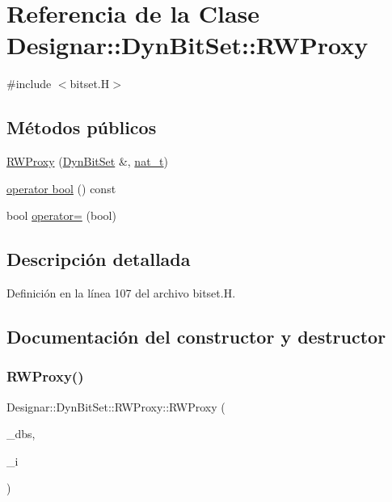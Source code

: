 \hypertarget{class_designar_1_1_dyn_bit_set_1_1_r_w_proxy}{}\section{Referencia de la Clase Designar\+:\+:Dyn\+Bit\+Set\+:\+:R\+W\+Proxy}
\label{class_designar_1_1_dyn_bit_set_1_1_r_w_proxy}


{\ttfamily \#include $<$bitset.\+H$>$}

\subsection*{Métodos públicos}
\begin{DoxyCompactItemize}
\item 
\hyperlink{class_designar_1_1_dyn_bit_set_1_1_r_w_proxy_aef016918f952b339bfb60b29f6b9bcbb}{R\+W\+Proxy} (\hyperlink{class_designar_1_1_dyn_bit_set}{Dyn\+Bit\+Set} \&, \hyperlink{namespace_designar_aa72662848b9f4815e7bf31a7cf3e33d1}{nat\+\_\+t})
\item 
\hyperlink{class_designar_1_1_dyn_bit_set_1_1_r_w_proxy_ae2b7bc44f30f8b75d8fc2306167f9598}{operator bool} () const
\item 
bool \hyperlink{class_designar_1_1_dyn_bit_set_1_1_r_w_proxy_ad9dff242f5550a97af94c1e4ecd163ad}{operator=} (bool)
\end{DoxyCompactItemize}


\subsection{Descripción detallada}


Definición en la línea 107 del archivo bitset.\+H.



\subsection{Documentación del constructor y destructor}
\mbox{\label{class_designar_1_1_dyn_bit_set_1_1_r_w_proxy_aef016918f952b339bfb60b29f6b9bcbb}} 
\subsubsection{\texorpdfstring{R\+W\+Proxy()}{RWProxy()}}
{\footnotesize\ttfamily Designar\+::\+Dyn\+Bit\+Set\+::\+R\+W\+Proxy\+::\+R\+W\+Proxy (\begin{DoxyParamCaption}\item[{\hyperlink{class_designar_1_1_dyn_bit_set}{Dyn\+Bit\+Set} \&}]{\+\_\+dbs,  }\item[{\hyperlink{namespace_designar_aa72662848b9f4815e7bf31a7cf3e33d1}{nat\+\_\+t}}]{\+\_\+i }\end{DoxyParamCaption})}



